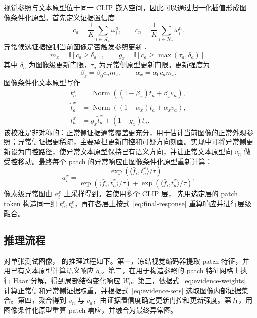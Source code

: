 视觉参照与文本原型位于同一 CLIP 嵌入空间，因此可以通过归一化插值形成图像条件化原型。首先定义证据置信度
\begin{equation}
  c_a=\frac{1}{K}\sum_{i\in\mathcal{A}_x}\omega_i^a,
  \qquad
  c_n=\frac{1}{K}\sum_{i\in\mathcal{N}_x}\omega_i^n .
  \label{eq:evidence-confidence}
\end{equation}
异常候选证据控制当前图像是否触发参照更新：
\begin{equation}
  m_x=\mathbb{I}[c_a\ge \delta_a],
  \qquad
  g_x=\mathbb{I}[c_a\ge \max(\tau_a,\delta_a)] .
  \label{eq:update-gates}
\end{equation}
其中 $\delta_a$ 为图像级更新门限，$\tau_a$ 为异常侧原型更新门限。更新强度为
\begin{equation}
  \beta_x=\beta_0 c_n m_x,
  \qquad
  \alpha_x=\alpha_0 c_a m_x .
  \label{eq:update-strength}
\end{equation}
图像条件化文本原型写作
\begin{align}
  t_n^x &= \operatorname{Norm}\left((1-\beta_x)t_n+\beta_x v_n\right),\\
  \widetilde{t}_a^x &= \operatorname{Norm}\left((1-\alpha_x)t_a+\alpha_x v_a\right),\\
  t_a^x &= g_x\widetilde{t}_a^x+(1-g_x)t_a .
  \label{eq:prototype-calibration}
\end{align}
该校准是非对称的：正常侧证据通常覆盖更充分，用于估计当前图像的正常外观参照；异常侧证据更稀疏，主要承担更新门控和可疑方向刻画。实现中可将异常侧更新设为门控路径，使异常文本原型保持已有语义方向，并让正常文本原型向 $v_n$ 做受控移动。最终每个 patch 的异常响应由图像条件化原型重新计算：
\begin{equation}
  a_i^x =
  \frac{\exp(\langle \bar f_i,\bar t_a^x\rangle/\tau)}
       {\exp(\langle \bar f_i,\bar t_n^x\rangle/\tau)+
        \exp(\langle \bar f_i,\bar t_a^x\rangle/\tau)} .
  \label{eq:final-response}
\end{equation}
像素级异常图由 $a_i^x$ 上采样得到。若使用多个 CLIP 层，\method{} 先用选定层的 patch token 构造同一组 $t_n^x,t_a^x$，再在各层上按式~\eqref{eq:final-response} 重算响应并进行层级融合。

\subsection{推理流程}

对单张测试图像，\method{} 的推理过程如下。第一，冻结视觉编码器提取 patch 特征，并用已有文本原型计算语义响应 $q_i$。第二，在用于构造参照的 patch 特征网格上执行 Haar 分解，得到局部结构变化响应 $W_i$。第三，依据式~\eqref{eq:evidence-weights} 计算正常侧和异常侧证据权重，并根据式~\eqref{eq:evidence-sets} 选取图像内部证据集合。第四，聚合得到 $v_n$ 与 $v_a$，由证据置信度确定更新门控和更新强度。第五，用图像条件化原型重算 patch 响应，并融合为最终异常图。

